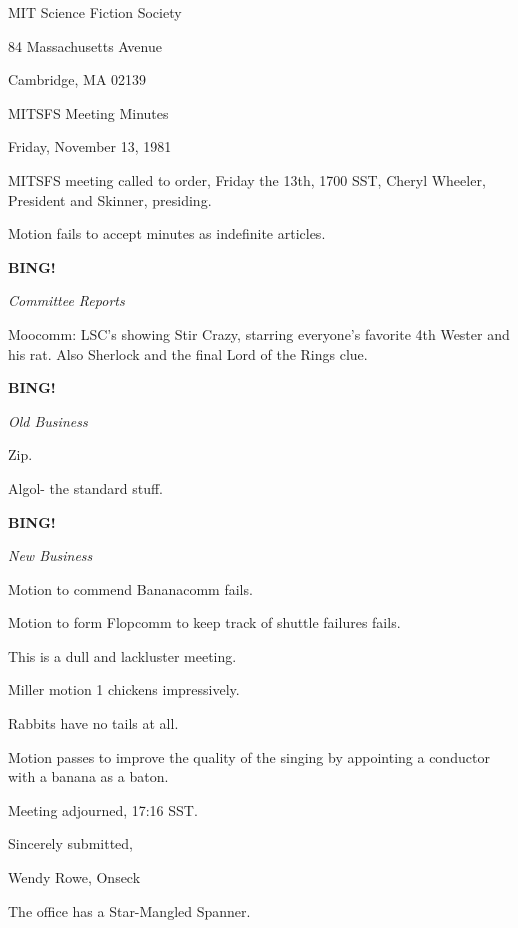 \documentclass[12pt]{article}
\newcommand{\bing}{{\bf BING!} }
\newcommand{\goto}[1]{\bing \vskip 12pt \centerline{{\em{#1}}}}
\begin{document}
\begin{center}

MIT Science Fiction Society 

84 Massachusetts Avenue

Cambridge, MA 02139

\vspace{12pt}

MITSFS Meeting Minutes 

Friday, November 13, 1981

\end{center}
 
\vspace{18pt}

\setlength{\parskip}{6pt}

\noindent
MITSFS meeting called to order, Friday the 13th, 1700 SST,
Cheryl Wheeler, President and Skinner, presiding.

Motion fails to accept minutes as indefinite articles.

\goto{Committee Reports}

Moocomm: LSC's showing Stir Crazy, starring everyone's favorite 4th Wester and his rat. Also Sherlock and the final Lord of the Rings clue.

\goto{Old Business}

Zip.

Algol- the standard stuff.

\goto{New Business}

Motion to commend Bananacomm fails.

Motion to form Flopcomm to keep track of shuttle failures fails.

This is a dull and lackluster meeting.

Miller motion 1 chickens impressively.

Rabbits have no tails at all.

Motion passes to improve the quality of the singing by appointing a conductor with a banana as a baton.

\vspace{12pt}

\noindent
Meeting adjourned, 17:16 SST.

\vspace{18pt}

\centerline{Sincerely submitted,}
\centerline{Wendy Rowe, Onseck}

The office has a Star-Mangled Spanner.
\end{document}

